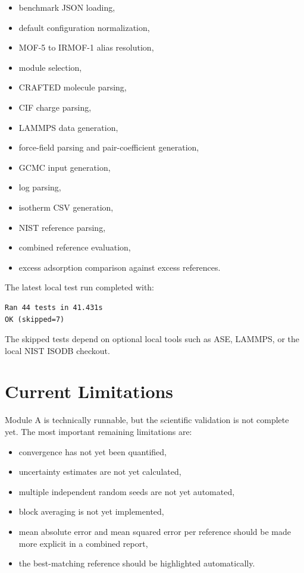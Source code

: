 \documentclass[11pt,a4paper]{article}
\begin{document}
\begin{itemize}
    \item benchmark JSON loading,
    \item default configuration normalization,
    \item MOF-5 to IRMOF-1 alias resolution,
    \item module selection,
    \item CRAFTED molecule parsing,
    \item CIF charge parsing,
    \item LAMMPS data generation,
    \item force-field parsing and pair-coefficient generation,
    \item GCMC input generation,
    \item log parsing,
    \item isotherm CSV generation,
    \item NIST reference parsing,
    \item combined reference evaluation,
    \item excess adsorption comparison against excess references.
\end{itemize}

The latest local test run completed with:

\begin{lstlisting}
Ran 44 tests in 41.431s
OK (skipped=7)
\end{lstlisting}

The skipped tests depend on optional local tools such as ASE, LAMMPS, or the local NIST ISODB checkout.

\section{Current Limitations}

Module A is technically runnable, but the scientific validation is not complete yet.
The most important remaining limitations are:

\begin{itemize}
    \item convergence has not yet been quantified,
    \item uncertainty estimates are not yet calculated,
    \item multiple independent random seeds are not yet automated,
    \item block averaging is not yet implemented,
    \item mean absolute error and mean squared error per reference should be made more explicit in a combined report,
    \item the best-matching reference should be highlighted automatically.
\end{itemize}
\end{document}

